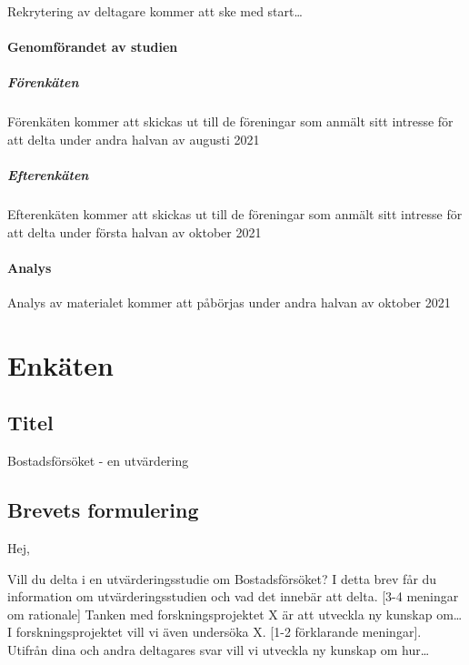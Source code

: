 \documentclass[]{tufte-handout}
\begin{document}
Rekrytering av deltagare kommer att ske med start\ldots{}

\hypertarget{genomfuxf6randet-av-studien}{%
\paragraph{Genomförandet av studien}\label{genomfuxf6randet-av-studien}}

\hypertarget{fuxf6renkuxe4ten}{%
\subparagraph{Förenkäten}\label{fuxf6renkuxe4ten}}

Förenkäten kommer att skickas ut till de föreningar som anmält sitt
intresse för att delta under andra halvan av augusti 2021

\hypertarget{efterenkuxe4ten}{%
\subparagraph{Efterenkäten}\label{efterenkuxe4ten}}

Efterenkäten kommer att skickas ut till de föreningar som anmält sitt
intresse för att delta under första halvan av oktober 2021

\hypertarget{analys}{%
\paragraph{Analys}\label{analys}}

Analys av materialet kommer att påbörjas under andra halvan av oktober
2021

\hypertarget{enkuxe4ten}{%
\section{Enkäten}\label{enkuxe4ten}}

\hypertarget{titel-1}{%
\subsection{Titel}\label{titel-1}}

Bostadsförsöket - en utvärdering

\hypertarget{brevets-formulering}{%
\subsection{Brevets formulering}\label{brevets-formulering}}

Hej,

Vill du delta i en utvärderingsstudie om Bostadsförsöket? I detta brev
får du information om utvärderingsstudien och vad det innebär att delta.
{[}3-4 meningar om rationale{]} Tanken med forskningsprojektet X är att
utveckla ny kunskap om\ldots{} I forskningsprojektet vill vi även
undersöka X. {[}1-2 förklarande meningar{]}. Utifrån dina och andra
deltagares svar vill vi utveckla ny kunskap om hur\ldots{}
\end{document}
